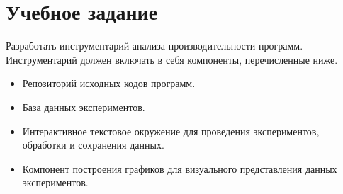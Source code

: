 \section*{Учебное задание}
Разработать инструментарий анализа производительности программ. Инструментарий должен включать в себя компоненты, перечисленные ниже.
\begin{itemize}
    \item Репозиторий исходных кодов программ.
    \item База данных экспериментов.
    \item Интерактивное текстовое окружение для проведения экспериментов, обработки и сохранения данных.
    \item Компонент построения графиков для визуального представления данных экспериментов.
\end{itemize}

